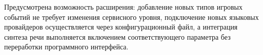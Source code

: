 Предусмотрена возможность расширения: добавление новых типов игровых событий не требует изменения сервисного уровня, подключение новых языковых провайдеров осуществляется через конфигурационный файл, а интеграция синтеза речи выполняется включением соответствующего параметра без переработки программного интерфейса.
